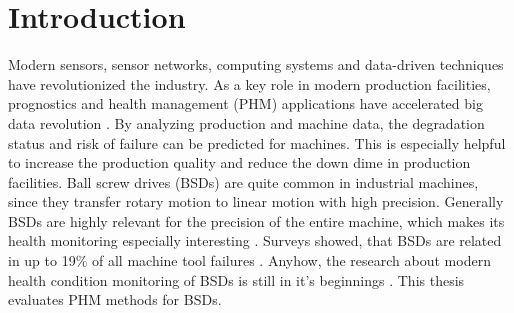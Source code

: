 
\chapter{Introduction}
Modern sensors, sensor networks, computing systems and data-driven techniques have revolutionized the industry. As a key role in modern production facilities, prognostics and health management (PHM) applications have accelerated big data revolution \cite{ZHAO2019213}. By analyzing production and machine data, the degradation status and risk of failure can be predicted for machines. This is especially helpful to increase the production quality and reduce the down dime in production facilities. Ball screw drives (BSDs) are quite common in industrial machines, since they transfer rotary motion to linear motion with high precision. Generally BSDs are highly relevant for the precision of the entire machine, which makes its health monitoring especially interesting \cite{LiPin2018}. Surveys showed, that BSDs are related in up to 19\% of all machine tool failures \cite{Denkena2021}. Anyhow, the research about modern health condition monitoring of BSDs is still in it's beginnings \cite{LiPin2018}. This thesis evaluates PHM methods for BSDs.


